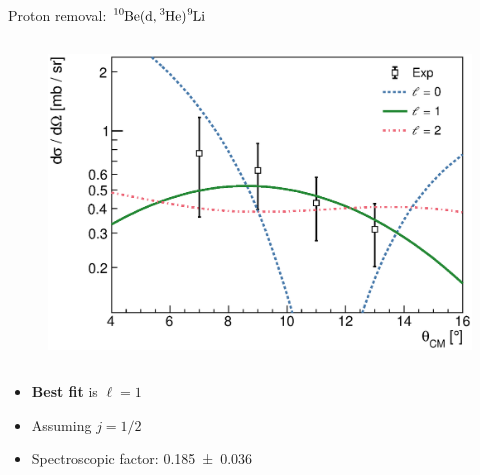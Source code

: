 \documentclass[sans,
frameno, %
mp,
usenames,dvipsnames, %
onlytextwidth, %
t,%
11pt]{beamer}
\newcommand{\iso}[2]{\ce{^{#1}#2}}
\begin{document}
\begin{frame}{Proton removal: $\iso{10}{Be}(\textrm{d}, \iso{3}{He})\iso{9}{Li}$}
{\begin{columns}[t]
{\begin{figure}
                    \centering
                    \includegraphics[width=\textwidth]{figures/Workshop/10Be_d3He_xs_1.eps}
                \end{figure}
            }
        \end{columns}

        \begin{itemize}
            \item \textbf{Best fit} is $\ell = 1$
            \item Assuming $j = 1/2$
            \item Spectroscopic factor: \num{0.185(36)}
        \end{itemize}
    }
\end{frame}
\end{document}
